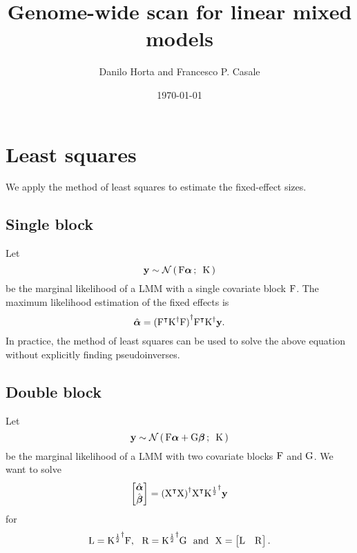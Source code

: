 \documentclass[twocolumn,draft]{article}
\title{Genome-wide scan for linear mixed models}
\author{Danilo Horta and Francesco P. Casale}
\date{\today}
\begin{document}
	\maketitle

	\section{Least squares}

	We apply the method of least squares to estimate the fixed-effect sizes.

	\subsection{Single block}

	Let
	\begin{equation}\label{eq:lmm}
		  \mathbf{y} \sim \mathcal{N}\left(\, {\mathrm{F}\boldsymbol{\alpha}} \,;\,~{\mathrm{K}} \,\right)
	\end{equation}
	be the marginal likelihood of a LMM with a single covariate block $\mathrm{F}$.
	The maximum likelihood estimation of the fixed effects is
	\begin{equation*}
			\hat{\boldsymbol{\alpha}} = {({\mathrm{F}}^\intercal{\mathrm{K}}^{\dagger}\mathrm{F})}^{\dagger}
				               {\mathrm{F}}^\intercal{\mathrm{K}}^{\dagger}\mathbf{y}.
	\end{equation*}
	In practice, the method of least squares can be used to solve the above
	equation without explicitly finding pseudoinverses.

	\subsection{Double block}

	Let
	\begin{equation*}
		  \mathbf{y} \sim \mathcal{N}\left(\, {\mathrm{F}\boldsymbol{\alpha} + \mathrm{G}\boldsymbol{\beta}} \,;\,~{\mathrm{K}} \,\right)
	\end{equation*}
	be the marginal likelihood of a LMM with two covariate blocks $\mathrm{F}$ and
	$\mathrm{G}$.
	We want to solve
	\begin{equation*}
			\begin{bmatrix}
						\hat{\boldsymbol{\alpha}} \\
								\hat{\boldsymbol{\beta}}
									\end{bmatrix} = {({\mathrm{X}}^\intercal\mathrm{X})}^{\dagger}{\mathrm{X}}^\intercal{\mathrm{K}^{\frac{1}{2}}}^{\dagger}\mathbf{y}
	\end{equation*}
	for
	\begin{equation*}
		\mathrm{L} = {\mathrm{K}^{\frac{1}{2}}}^{\dagger}\mathrm{F},~~ \mathrm{R} = {\mathrm{K}^{\frac{1}{2}}}^{\dagger}\mathrm{G}~~\text{and}~~
			\mathrm{X} =
					\begin{bmatrix}
									\mathrm{L} & \mathrm{R}
											\end{bmatrix}.
	\end{equation*}
\end{document}
